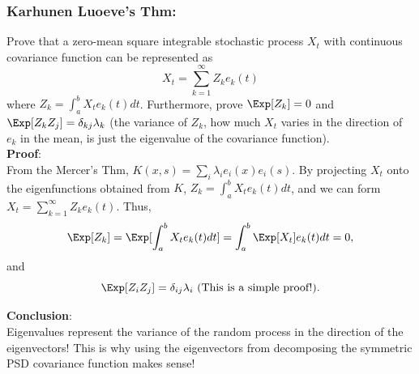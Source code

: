 \subsubsection{\bf Karhunen Luoeve's Thm:} 
    Prove that a zero-mean square integrable stochastic process $X_t$ with continuous covariance function can be represented as 
    \begin{equation} 
        X_t = \sum_{k=1}^\infty Z_k e_k(t) 
    \end{equation} 
    where $Z_k = \int_a^b X_t e_k(t) dt$.  
    Furthermore, prove $\Exp[Z_{k}] = 0$ and $\Exp[Z_{k}Z_{j}] = \delta_{kj}\lambda_{k}$ 
    (the variance of $Z_{k}$, how much $X_{t}$ varies in the direction of $e_{k}$ in the mean, is just the eigenvalue of the covariance function). \\ 
    
    {\bf Proof}: \\ 
    From the Mercer's Thm, $K(x,s) = \sum_{i} \lambda_{i} e_{i}(x) e_{i}(s)$.  
    By projecting $X_t$ onto the eigenfunctions obtained from $K$, $Z_k = \int_a^b X_t e_k(t) dt$, and we can form $X_t = \sum_{k=1}^\infty Z_k e_k(t)$.  
    Thus, 
    \begin{equation} 
        \Exp[Z_k] = \Exp[\int_a^b X_t e_k(t) dt] = \int_a^b \Exp[X_t] e_k(t)dt = 0, 
    \end{equation} 
    and 
    \begin{equation} 
        \Exp[Z_{i}Z_{j}] = \delta_{ij} \lambda_{i} \ (\text{This is a simple proof!}).  
    \end{equation}

    {\bf Conclusion}: \\ Eigenvalues represent the variance of the random process in the direction of the 
    eigenvectors! This is why using the eigenvectors from decomposing the symmetric PSD covariance function makes sense!

